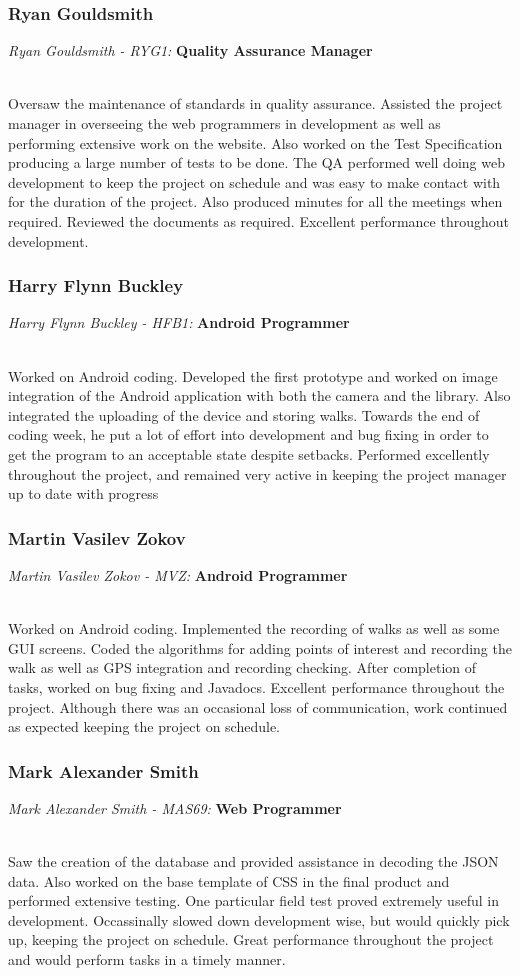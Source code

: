 \documentclass[12pt]{article}
\begin{document}
\subsubsection{Ryan Gouldsmith}
\centerline{\emph{Ryan Gouldsmith - RYG1:}\textbf{ Quality Assurance Manager}}
~\\
Oversaw the maintenance of standards in quality assurance. Assisted the project manager in overseeing the web programmers in development as well as performing extensive work on the website. Also worked on the Test Specification producing a large number of tests to be done. The QA performed well doing web development to keep the project on schedule and was easy to make contact with for the duration of the project. Also produced minutes for all the meetings when required. Reviewed the documents as required. Excellent performance throughout development.

\subsubsection{Harry Flynn Buckley}
\centerline{\emph{Harry Flynn Buckley - HFB1:}\textbf{ Android Programmer}}
~\\
Worked on Android coding. Developed the first prototype and worked on image integration of the Android application with both the camera and the library. Also integrated the uploading of the device and storing walks. Towards the end of coding week, he put a lot of effort into development and bug fixing in order to get the program to an acceptable state despite setbacks. Performed excellently throughout the project, and remained very active in keeping the project manager up to date with progress

\subsubsection{Martin Vasilev Zokov }
\centerline{\emph{Martin Vasilev Zokov - MVZ:}\textbf{ Android Programmer}}
~\\
Worked on Android coding. Implemented the recording of walks as well as some GUI screens. Coded the algorithms for adding points of interest and recording the walk as well as GPS integration and recording checking. After completion of tasks, worked on bug fixing and Javadocs. Excellent performance throughout the project. Although there was an occasional loss of communication, work continued as expected keeping the project on schedule.

\subsubsection{Mark Alexander Smith}
\centerline{\emph{Mark Alexander Smith - MAS69:}\textbf{ Web Programmer}}
~\\
Saw the creation of the database and provided assistance in decoding the JSON data. Also worked on the base template of CSS in the final product and performed extensive testing. One particular field test proved extremely useful in development. Occassinally slowed down development wise, but would quickly pick up, keeping the project on schedule. Great performance throughout the project and would perform tasks in a timely manner.
\end{document}
